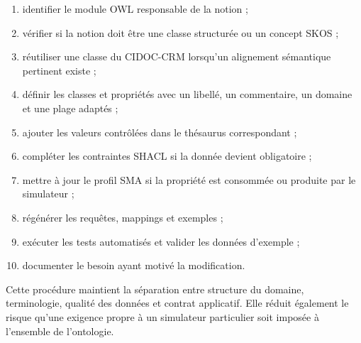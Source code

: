 \documentclass{article}
\begin{document}
\begin{enumerate}
    \item identifier le module OWL responsable de la notion ;
    \item vérifier si la notion doit être une classe structurée ou un concept SKOS ;
    \item réutiliser une classe du CIDOC-CRM lorsqu'un alignement sémantique pertinent existe ;
    \item définir les classes et propriétés avec un libellé, un commentaire, un domaine et une plage adaptés ;
    \item ajouter les valeurs contrôlées dans le thésaurus correspondant ;
    \item compléter les contraintes SHACL si la donnée devient obligatoire ;
    \item mettre à jour le profil SMA si la propriété est consommée ou produite par le simulateur ;
    \item régénérer les requêtes, mappings et exemples ;
    \item exécuter les tests automatisés et valider les données d'exemple ;
    \item documenter le besoin ayant motivé la modification.
\end{enumerate}

Cette procédure maintient la séparation entre structure du domaine, terminologie, qualité des données et contrat applicatif. Elle réduit également le risque qu'une exigence propre à un simulateur particulier soit imposée à l'ensemble de l'ontologie.
\end{document}
